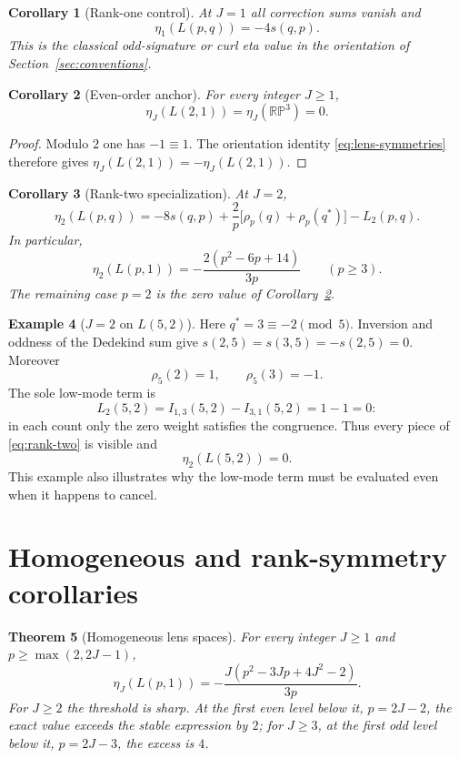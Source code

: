 \documentclass[11pt]{article}
\newtheorem{theorem}{Theorem}[section]
\newtheorem{corollary}[theorem]{Corollary}
\theoremstyle{definition}
\newtheorem{example}[theorem]{Example}
\begin{document}
\begin{corollary}[Rank-one control]
\label{cor:rank-one}
At $J=1$ all correction sums vanish and
\begin{equation}
 \eta_1(L(p,q))=-4s(q,p).
 \label{eq:rank-one}
\end{equation}
This is the classical odd-signature or curl eta value in the orientation of
Section~\ref{sec:conventions}.
\end{corollary}

\begin{corollary}[Even-order anchor]
\label{cor:rp3}
For every integer $J\geq1$,
\[
 \eta_J(L(2,1))=\eta_J(\mathbb{RP}^3)=0.
\]
\end{corollary}

\begin{proof}
Modulo $2$ one has $-1\equiv1$.  The orientation identity
\eqref{eq:lens-symmetries} therefore gives
$\eta_J(L(2,1))=-\eta_J(L(2,1))$.
\end{proof}

\begin{corollary}[Rank-two specialization]
\label{cor:rank-two}
At $J=2$,
\begin{equation}
 \eta_2(L(p,q))=-8s(q,p)
 +\frac2p\bigl[\rho_p(q)+\rho_p(q^*)\bigr]-L_2(p,q).
 \label{eq:rank-two}
\end{equation}
In particular,
\[
 \eta_2(L(p,1))=-\frac{2(p^2-6p+14)}{3p}
 \qquad(p\geq3).
\]
The remaining case $p=2$ is the zero value of
Corollary~\ref{cor:rp3}.
\end{corollary}

\begin{example}[$J=2$ on $L(5,2)$]
\label{ex:J2-L52}
Here $q^*=3\equiv-2\pmod5$.  Inversion and oddness of the Dedekind sum give
$s(2,5)=s(3,5)=-s(2,5)=0$.  Moreover
\[
 \rho_5(2)=1,\qquad \rho_5(3)=-1.
\]
The sole low-mode term is
\[
 L_2(5,2)=I_{1,3}(5,2)-I_{3,1}(5,2)=1-1=0:
\]
in each count only the zero weight satisfies the congruence.  Thus every
piece of \eqref{eq:rank-two} is visible and
\[
 \eta_2(L(5,2))=0.
\]
This example also illustrates why the low-mode term must be evaluated even
when it happens to cancel.
\end{example}

\section{Homogeneous and rank-symmetry corollaries}
\label{sec:corollaries}

\begin{theorem}[Homogeneous lens spaces]
\label{cor:eta-homogeneous}
For every integer $J\geq1$ and
$p\geq\max(2,2J-1)$,
\begin{equation}
 \eta_J(L(p,1))
 =-\frac{J\left(p^2-3Jp+4J^2-2\right)}{3p}.
 \label{eq:homogeneous}
\end{equation}
For $J\geq2$ the threshold is sharp.  At the first even level below it,
$p=2J-2$, the exact value exceeds the stable expression by $2$; for $J\geq3$,
at the first odd level below it, $p=2J-3$, the excess is $4$.
\end{theorem}
\end{document}
